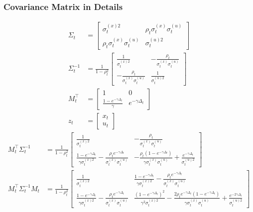 \subsubsection*{Covariance Matrix in Details}\label{covMatrixdetails}
\begin{align*}
\Sigma_t &= \begin{bmatrix}
\sigma_t^{(x)2} & \rho_{t} \sigma_t^{(x)} \sigma_t^{(u)}\\
 \rho_{t} \sigma_t^{(x)} \sigma_t^{(u)} & \sigma_t^{(u)2} 
\end{bmatrix}\\
\Sigma_t^{-1} &= \frac{1}{1-\rho_{t}^2} \begin{bmatrix} \frac{1}{\sigma_t^{(x)2}} & -\frac{\rho_{t}}{\sigma_t^{(x)} \sigma_t^{(u)} }\\
-\frac{\rho_{t}}{\sigma_t^{(x)} \sigma_t^{(u)} } & \frac{1}{\sigma_t^{(u)2}} \end{bmatrix}\\
M_t^\top &= \begin{bmatrix}
1 & 0 \\
\frac{1-e^{-\gamma \Delta_t}}{\gamma} & e^{-\gamma \Delta_t}
\end{bmatrix} \\
z_t &= \begin{bmatrix} x_t \\ u_t \end{bmatrix}
\end{align*}
\begin{align*}
M_t^\top \Sigma_t^{-1} &= \frac{1}{1-\rho_{t}^2} 
\begin{bmatrix}
\frac{1}{\sigma_t^{(x)2}}  & -\frac{\rho_{t}}{\sigma_t^{(x)} \sigma_t^{(u)} }\\
\frac{1-e^{-\gamma \Delta_t}}{\gamma\sigma_t^{(x)2}} -\frac{\rho_{t} e^{-\gamma \Delta_t}}{\sigma_t^{(x)} \sigma_t^{(u)} }  & 
 -\frac{\rho_{t} (1-e^{-\gamma \Delta_t}) }{ \gamma \sigma_t^{(x)} \sigma_t^{(u)} } + \frac{  e^{-\gamma\Delta_t} }{   \sigma_t^{(u)2} }
\end{bmatrix} \\
M_t^\top \Sigma_t^{-1} M_t&= \frac{1}{1-\rho_{t}^2} 
\begin{bmatrix}
\frac{1}{\sigma_t^{(x)2}}  &  \frac{1-e^{-\gamma\Delta_t}}{\gamma\sigma_t^{(x)2}} -\frac{\rho_{t} e^{-\gamma\Delta_t}}{\sigma_t^{(x)}\sigma_t^{(u)}} \\
\frac{1-e^{-\gamma \Delta_t}}{\gamma\sigma_t^{(x)2}} -\frac{\rho_{t} e^{-\gamma \Delta_t}}{\sigma_t^{(x)} \sigma_t^{(u)} }  & 
\frac{ (1-e^{-\gamma \Delta_t})^2}{\gamma^2\sigma_t^{(x)2}} - \frac{2 \rho_{t} e^{-\gamma \Delta_t} (1-e^{-\gamma\Delta_t}) }{\gamma\sigma_t^{(x)} \sigma_t^{(u)} } +\frac{e^{-2\gamma\Delta_t}}{\sigma_t^{(u)2}}
\end{bmatrix} 
\end{align*}

